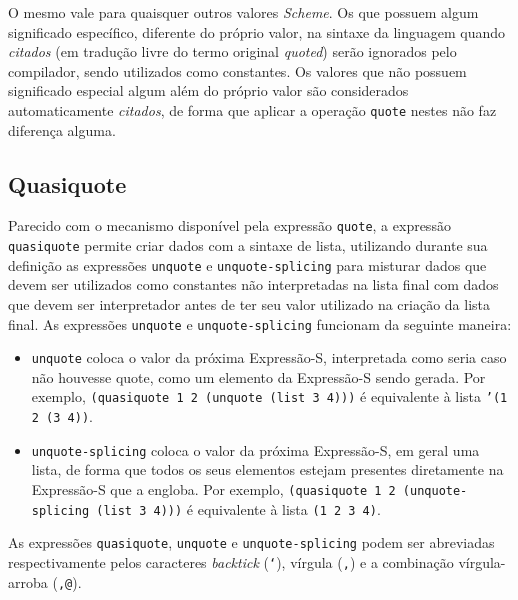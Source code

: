 O mesmo vale para quaisquer outros valores \textit{Scheme}. Os que possuem
algum significado específico, diferente do próprio valor, na sintaxe da
linguagem quando \textit{citados} (em tradução livre do termo original
\textit{quoted}) serão ignorados pelo compilador, sendo utilizados como
constantes. Os valores que não possuem significado especial algum além do
próprio valor são considerados automaticamente \textit{citados}, de forma que
aplicar a operação \texttt{quote} nestes não faz diferença alguma.

\subsection{Quasiquote}
\label{ss:quasiquote}

Parecido com o mecanismo disponível pela expressão \texttt{quote}, a expressão
\texttt{quasiquote} permite criar dados com a sintaxe de lista, utilizando
durante sua definição as expressões \texttt{unquote} e \texttt{unquote-splicing}
para misturar dados que devem ser utilizados como constantes não interpretadas
na lista final com dados que devem ser interpretador antes de ter seu valor 
utilizado na criação da lista final. As expressões \texttt{unquote} e 
\texttt{unquote-splicing} funcionam da seguinte maneira:

\begin{itemize}

\item \texttt{unquote} coloca o valor da próxima Expressão-S, interpretada como
seria caso não houvesse quote, como um elemento da Expressão-S sendo gerada.
Por exemplo, \texttt{(quasiquote 1 2 (unquote (list 3 4)))} é equivalente à lista
\texttt{'(1 2 (3 4))}.

\item \texttt{unquote-splicing} coloca o valor da próxima Expressão-S, em geral
uma lista, de forma que todos os seus elementos estejam presentes diretamente
na Expressão-S que a engloba. Por exemplo, \texttt{(quasiquote 1 2
(unquote-splicing (list 3 4)))} é equivalente à lista \texttt{(1 2 3 4)}.

\end{itemize}

As expressões \texttt{quasiquote}, \texttt{unquote} e \texttt{unquote-splicing}
podem ser abreviadas respectivamente pelos caracteres \textit{backtick}
(\texttt{`}), vírgula (\texttt{,}) e a combinação vírgula-arroba (\texttt{,@}).
